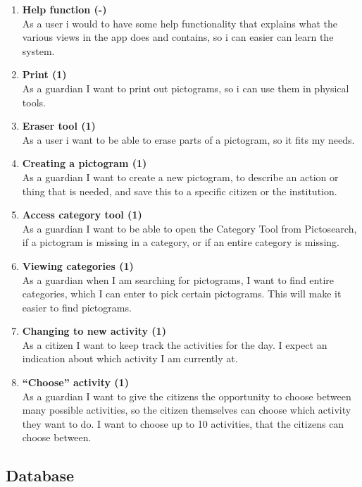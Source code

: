 \begin{enumerate}
	\item \textbf{Help function (-)}\\
	As a user i would to have some help functionality that explains what the various views in the app does and contains, so i can easier can learn the system.
	
	\item \textbf{Print (1)}\\
	As a guardian I want to print out pictograms, so i can use them in physical tools.
	
	\item \textbf{Eraser tool (1)}\\
	As a user i want to be able to erase parts of a pictogram, so it fits my needs.
	
	\item \textbf{Creating a pictogram (1)}\\
	As a guardian I want to create a new pictogram, to describe an action or thing that is needed, and save this to a specific citizen or the institution.
	
	\item \textbf{Access category tool (1)}\\
	As a guardian I want to be able to open the Category Tool from Pictosearch, if a pictogram is missing in a category, or if an entire category is missing. 
	
	\item \textbf{Viewing categories (1)}\\ 
	As a guardian when I am searching for pictograms, I want to find entire categories, which I can enter to pick certain pictograms. This will make it easier to find pictograms.
	
	\item \textbf{Changing to new activity (1)}\\ 
	As a citizen I want to keep track the activities for the day. I expect an indication about which activity I am currently at.
	
	\item \textbf{“Choose” activity (1)}\\
	As a guardian I want to give the citizens the opportunity to choose between many possible activities, so the citizen themselves can choose which activity they want to do. I want to choose up to 10 activities, that the citizens can choose between.
\end{enumerate}

\subsection{Database}

